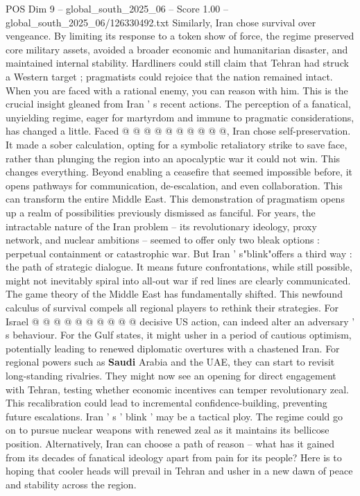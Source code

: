 \begin{textsample}{POS Dim 9 – global\_south\_2025\_06 – Score 1.00 – global\_south\_2025\_06/126330492.txt}
Similarly, Iran chose survival over vengeance.
By limiting its response to a token show of force, the regime preserved core military assets, avoided a broader economic and humanitarian disaster, and maintained internal stability.
Hardliners could still claim that Tehran had struck a Western target ; pragmatists could rejoice that the nation remained intact.
When you are faced with a rational enemy, you can reason with him.
This is the crucial insight gleaned from Iran ' s recent actions.
The perception of a fanatical, unyielding regime, eager for martyrdom and immune to pragmatic considerations, has changed a little.
Faced @ @ @ @ @ @ @ @ @ @, Iran chose self-preservation.
It made a sober calculation, opting for a symbolic retaliatory strike to save face, rather than plunging the region into an apocalyptic war it could not win.
This changes everything.
Beyond enabling a ceasefire that seemed impossible before, it opens pathways for communication, de-escalation, and even collaboration.
This can transform the entire Middle East.
This demonstration of pragmatism opens up a realm of possibilities previously dismissed as fanciful.
For years, the intractable nature of the Iran problem -- its revolutionary ideology, proxy network, and nuclear ambitions -- seemed to offer only two bleak options : perpetual containment or catastrophic war.
But Iran ' s"blink"offers a third way : the path of strategic dialogue.
It means future confrontations, while still possible, might not inevitably spiral into all-out war if red lines are clearly communicated.
The game theory of the Middle East has fundamentally shifted.
This newfound calculus of survival compels all regional players to rethink their strategies.
For Israel @ @ @ @ @ @ @ @ @ @ decisive US action, can indeed alter an adversary ' s behaviour.
For the Gulf states, it might usher in a period of cautious optimism, potentially leading to renewed diplomatic overtures with a chastened Iran.
For regional powers such as \textbf{Saudi} Arabia and the UAE, they can start to revisit long-standing rivalries.
They might now see an opening for direct engagement with Tehran, testing whether economic incentives can temper revolutionary zeal.
This recalibration could lead to incremental confidence-building, preventing future escalations.
Iran ' s ' blink ' may be a tactical ploy.
The regime could go on to pursue nuclear weapons with renewed zeal as it maintains its bellicose position.
Alternatively, Iran can choose a path of reason -- what has it gained from its decades of fanatical ideology apart from pain for its people?
Here is to hoping that cooler heads will prevail in Tehran and usher in a new dawn of peace and stability across the region.

\end{textsample}

